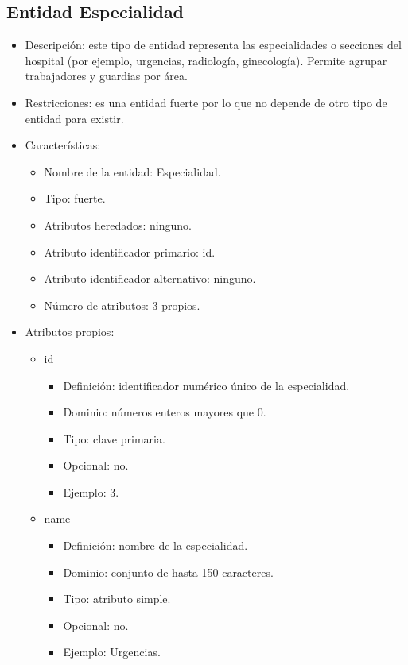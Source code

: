 \subsection{Entidad Especialidad}
\begin{itemize}
    \item Descripción: este tipo de entidad representa las especialidades o secciones del hospital (por ejemplo, urgencias, radiología, ginecología). Permite agrupar trabajadores y guardias por área.
    \item Restricciones: es una entidad fuerte por lo que no depende de otro tipo de entidad para existir.
    \item Características:
    \begin{itemize}
        \item Nombre de la entidad: Especialidad.
        \item Tipo: fuerte.
        \item Atributos heredados: ninguno.
        \item Atributo identificador primario: id.
        \item Atributo identificador alternativo: ninguno.
        \item Número de atributos: 3 propios.
    \end{itemize}

    \item Atributos propios:
    \begin{itemize}
        \item id
        \begin{itemize}
            \item Definición: identificador numérico único de la especialidad.
            \item Dominio: números enteros mayores que 0.
            \item Tipo: clave primaria.
            \item Opcional: no.
            \item Ejemplo: 3.
        \end{itemize}

        \item name
        \begin{itemize}
            \item Definición: nombre de la especialidad.
            \item Dominio: conjunto de hasta 150 caracteres.
            \item Tipo: atributo simple.
            \item Opcional: no.
            \item Ejemplo: Urgencias.
        \end{itemize}


\end{itemize}
\end{itemize}
